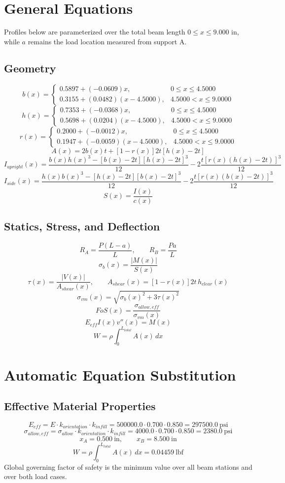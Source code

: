 \documentclass[11pt]{article}
\begin{document}
\section*{General Equations}
Profiles below are parameterized over the total beam length $0 \le x \le 9.000$ in, while $a$ remains the load location measured from support A.
\subsection*{Geometry}
\[
b(x)=\begin{cases}0.5897 + (-0.0609)x, & 0 \le x \le 4.5000\\0.3155 + (0.0482)(x-4.5000), & 4.5000 < x \le 9.0000\end{cases}
\]
\[
h(x)=\begin{cases}0.7353 + (-0.0368)x, & 0 \le x \le 4.5000\\0.5698 + (0.0204)(x-4.5000), & 4.5000 < x \le 9.0000\end{cases}
\]
\[
r(x)=\begin{cases}0.2000 + (-0.0012)x, & 0 \le x \le 4.5000\\0.1947 + (-0.0059)(x-4.5000), & 4.5000 < x \le 9.0000\end{cases}
\]
\[
A(x)=2b(x)t+[1-r(x)]2t[h(x)-2t]
\]
\[
I_{upright}(x)=\frac{b(x)h(x)^3-[b(x)-2t][h(x)-2t]^3}{12}-2\frac{t[r(x)(h(x)-2t)]^3}{12}
\]
\[
I_{side}(x)=\frac{h(x)b(x)^3-[h(x)-2t][b(x)-2t]^3}{12}-2\frac{t[r(x)(b(x)-2t)]^3}{12}
\]
\[
S(x)=\frac{I(x)}{c(x)}
\]

\subsection*{Statics, Stress, and Deflection}
\[
R_A=\frac{P(L-a)}{L}, \qquad R_B=\frac{Pa}{L}
\]
\[
\sigma_b(x)=\frac{|M(x)|}{S(x)}
\]
\[
\tau(x)=\frac{|V(x)|}{A_{shear}(x)}, \qquad A_{shear}(x)=[1-r(x)]2t\,h_{clear}(x)
\]
\[
\sigma_{vm}(x)=\sqrt{\sigma_b(x)^2+3\tau(x)^2}
\]
\[
FoS(x)=\frac{\sigma_{allow,eff}}{\sigma_{vm}(x)}
\]
\[
E_{eff}I(x)v''(x)=M(x)
\]
\[
W=\rho\int_0^{L_{total}} A(x)\,dx
\]

\section*{Automatic Equation Substitution}
\subsection*{Effective Material Properties}
\[E_{eff} = E \cdot k_{orientation} \cdot k_{infill} = 500000.0 \cdot 0.700 \cdot 0.850 = 297500.0\ \mathrm{psi}\]
\[\sigma_{allow,eff} = \sigma_{allow} \cdot k_{orientation} \cdot k_{infill} = 4000.0 \cdot 0.700 \cdot 0.850 = 2380.0\ \mathrm{psi}\]
\[x_A = 0.500\ \mathrm{in}, \qquad x_B = 8.500\ \mathrm{in}\]
\[W = \rho \int_0^{L_{total}} A(x)\,dx = 0.04459\ \mathrm{lbf}\]
Global governing factor of safety is the minimum value over all beam stations and over both load cases.
\end{document}
